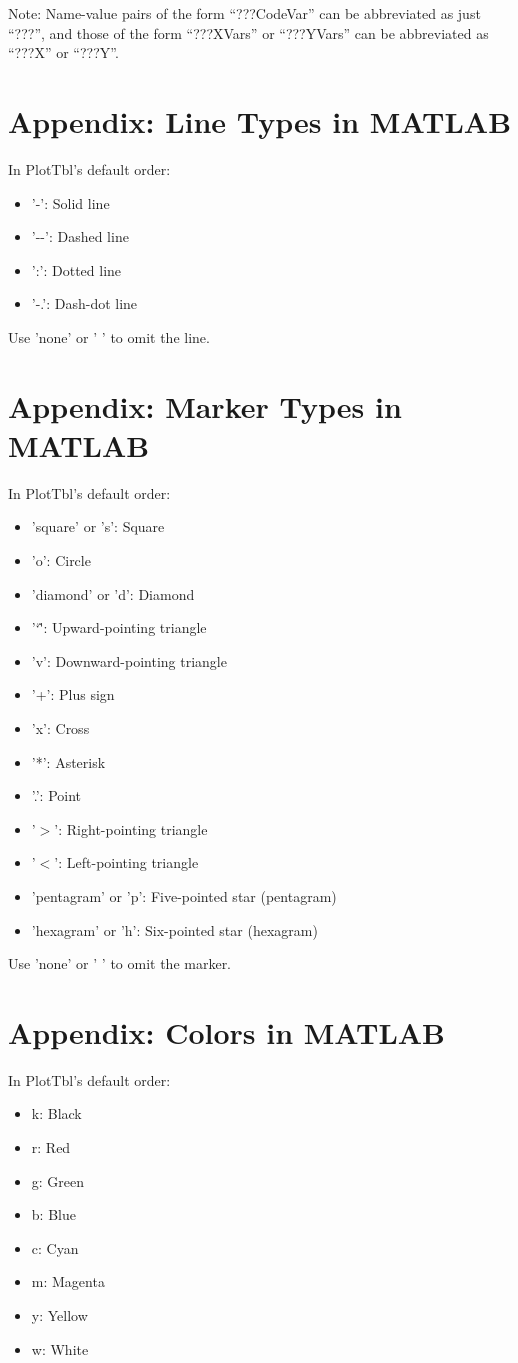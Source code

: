 \documentclass{article}
\newcommand{\caret}{\char`\^}
\begin{document}
Note: Name-value pairs of the form ``???CodeVar'' can be abbreviated as just ``???'',
and those of the form ``???XVars'' or ``???YVars'' can be abbreviated as ``???X'' or ``???Y''.

\section{Appendix: Line Types in MATLAB}

In PlotTbl's default order:

\begin{itemize}
\item '-': Solid line
\item '-{}-': Dashed line  %
\item ':': Dotted line
\item '-.': Dash-dot line
\end{itemize}

Use 'none' or ' ' to omit the line.

\section{Appendix: Marker Types in MATLAB}

In PlotTbl's default order:

\begin{itemize}
\item 'square' or 's': Square
\item 'o': Circle
\item 'diamond' or 'd': Diamond
\item '\caret': Upward-pointing triangle
\item 'v': Downward-pointing triangle
\item '+': Plus sign
\item 'x': Cross
\item '*': Asterisk
\item '.': Point
\item '$>$': Right-pointing triangle
\item '$<$': Left-pointing triangle
\item 'pentagram' or 'p': Five-pointed star (pentagram)
\item 'hexagram' or 'h': Six-pointed star (hexagram)
\end{itemize}

Use 'none' or ' ' to omit the marker.

\section{Appendix: Colors in MATLAB}

In PlotTbl's default order:

\begin{itemize}
\item k: Black
\item r: Red
\item g: Green
\item b: Blue
\item c: Cyan
\item m: Magenta
\item y: Yellow
\item w: White
\end{itemize}
\end{document}
